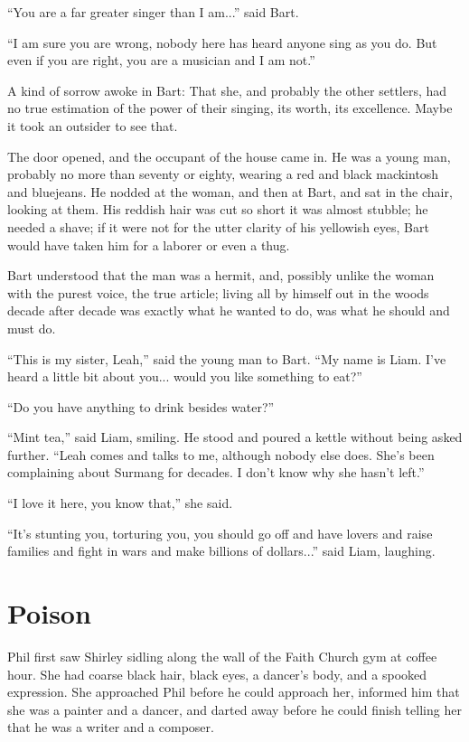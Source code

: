 \documentclass[english,11pt,letterpaper,onecolumn]{scrbook}
\begin{document}
	``You are a far greater singer than I am...'' said Bart.

	``I am sure you are wrong, nobody here has heard anyone sing as you do.  But even if you are right, you are a musician and I am not.''

	A kind of sorrow awoke in Bart:  That she, and probably the other settlers, had no true estimation of the power of their singing, its worth, its excellence.  Maybe it took an outsider to see that.

	The door opened, and the occupant of the house came in.  He was a young man, probably no more than seventy or eighty, wearing a red and black mackintosh and bluejeans.  He nodded at the woman, and then at Bart, and sat in the chair, looking at them.  His reddish hair was cut so short it was almost stubble; he needed a shave; if it were not for the utter clarity of his yellowish eyes, Bart would have taken him for a laborer or even a thug.  

	Bart understood that the man was a hermit, and, possibly unlike the woman with the purest voice, the true article; living all by himself out in the woods decade after decade was exactly what he wanted to do, was what he should and must do.

	``This is my sister, Leah,'' said the young man to Bart.  ``My name is Liam.  I've heard a little bit about you... would you like something to eat?''

	``Do you have anything to drink besides water?''

	``Mint tea,'' said Liam, smiling.  He stood and poured a kettle without being asked further.  ``Leah comes and talks to me, although nobody else does.  She's been complaining about Surmang for decades.  I don't know why she hasn't left.''

	``I love it here, you know that,'' she said.	

	``It's stunting you, torturing you, you should go off and have lovers and raise families and fight in wars and make billions of dollars...'' said Liam, laughing.
	
\newpage
\chapter{Poison}
Phil first saw Shirley sidling along the wall of the Faith Church gym at coffee hour.  She had coarse black hair, black eyes, a dancer's body, and a spooked expression.  She approached Phil before he could approach her, informed him that she was a painter and a dancer, and darted away before he could finish telling her that he was a writer and a composer.
\end{document}

